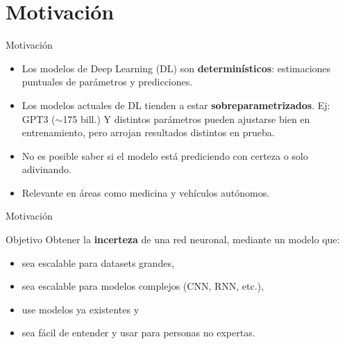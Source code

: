 \section{Motivación}
\begin{frame}{Motivación}
   \begin{itemize}[<+->]
       \item Los modelos de Deep Learning (DL) son \textbf{determinísticos}: estimaciones puntuales de parámetros y predicciones.
       \item Los modelos actuales de DL tienden a estar \textbf{sobreparametrizados}. Ej: GPT3 ($\sim$175 bill.) Y distintos parámetros pueden ajustarse bien en entrenamiento, pero arrojan resultados distintos en prueba. 
       \item No es posible saber si el modelo está prediciendo con certeza o solo adivinando.
       \item Relevante en áreas como medicina y vehículos autónomos.
       
       
   \end{itemize}
\end{frame}

\begin{frame}{Motivación}



   
\end{frame}

\begin{frame}{Objetivo}
    Obtener la \textbf{incerteza} de una red neuronal, mediante un modelo que:
    \begin{itemize}
        \item sea escalable para datasets grandes,
        \item sea escalable para modelos complejos (CNN, RNN, etc.),
        \item use modelos ya existentes y
        \item sea fácil de entender y usar para personas no expertas.
    \end{itemize}
\end{frame}


